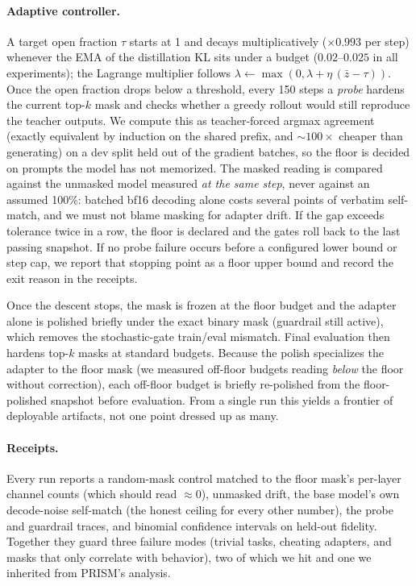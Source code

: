 \documentclass{article}
\begin{document}
\paragraph{Adaptive controller.}\label{sec:controller}
A target open fraction $\tau$ starts at 1 and decays multiplicatively
($\times 0.993$ per step) whenever the EMA of the distillation KL sits under
a budget ($0.02$--$0.025$ in all experiments); the Lagrange multiplier
follows $\lambda \leftarrow \max(0, \lambda + \eta\,(\bar z - \tau))$. Once
the open fraction drops below a threshold, every 150 steps a \emph{probe}
hardens the current top-$k$ mask and checks whether a greedy rollout would
still reproduce the teacher outputs. We compute this as teacher-forced argmax
agreement (exactly equivalent by induction on the shared prefix, and
${\sim}100\times$ cheaper than generating) on a dev split held out of the
gradient batches, so the floor is decided on prompts the model has not
memorized. The masked reading is compared against the unmasked model measured
\emph{at the same step}, never against an assumed 100\%: batched bf16 decoding
alone costs several points of verbatim self-match, and we must not blame
masking for adapter drift. If the gap exceeds tolerance twice in a row, the
floor is declared and the gates roll back to the last passing snapshot. If no
probe failure occurs before a configured lower bound or step cap, we report
that stopping point as a floor upper bound and record the exit reason in the
receipts.

Once the descent stops, the mask is frozen at the floor budget and the
adapter alone is polished briefly under the exact binary mask (guardrail
still active), which removes the stochastic-gate train/eval mismatch. Final
evaluation then hardens top-$k$ masks at standard budgets. Because the polish
specializes the adapter to the floor mask (we measured off-floor budgets
reading \emph{below} the floor without correction), each off-floor budget is
briefly re-polished from the floor-polished snapshot before evaluation. From
a single run this yields a frontier of deployable artifacts, not one point
dressed up as many.

\paragraph{Receipts.} Every run reports a random-mask control matched to the
floor mask's per-layer channel counts (which should read ${\approx}0$),
unmasked drift, the base model's own decode-noise self-match (the honest
ceiling for every other number), the probe and guardrail traces, and binomial
confidence intervals on held-out fidelity. Together they guard three failure
modes (trivial tasks, cheating adapters, and masks that only correlate with
behavior), two of which we hit and one we inherited from PRISM's analysis.
\end{document}
